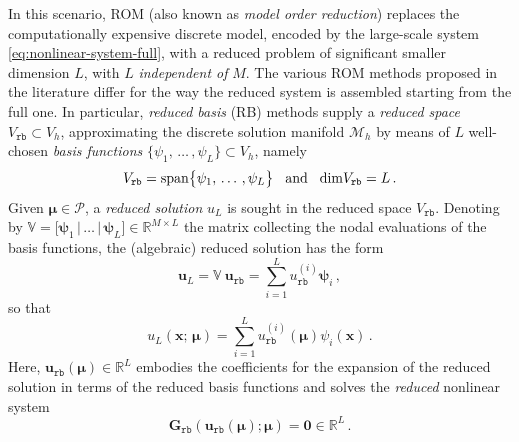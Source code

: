 \documentclass[12pt, a4paper, twoside, openright, notitlepage]{report}
\numberwithin{equation}{chapter}
\theoremstyle{theorem}
\theoremstyle{definition}
\theoremstyle{remark}
\theoremstyle{proposition}
\numberwithin{figure}{chapter}
\newcommand{\bg}[1]{\boldsymbol{#1}}
\begin{document}
		In this scenario, ROM (also known as \emph{model order reduction}) replaces the computationally expensive discrete model, encoded by the large-scale system \eqref{eq:nonlinear-system-full}, with a reduced problem of significant smaller dimension $L$, with $L$ \emph{independent of} $M$. The various ROM methods proposed in the literature differ for the way the reduced system is assembled starting from the full one. In particular, \emph{reduced basis} (RB) methods supply a \emph{reduced space} $V_{\texttt{rb}} \subset V_h$, approximating the discrete solution manifold $\mathcal{M}_h$ by means of $L$ well-chosen \emph{basis functions} $\big\lbrace \psi_1, \, \ldots \, , \psi_L \big\rbrace \subset V_h$, namely
		\begin{equation*}
			V_{\texttt{rb}} = \text{span}\big\lbrace \psi_1, \, \ldots \, , \psi_L \big\rbrace \hspace*{0.3cm} \text{and} \hspace*{0.3cm} \text{dim} V_{\texttt{rb}} = L \, .
		\end{equation*}
		Given $\boldsymbol{\mu} \in \mathcal{P}$, a \emph{reduced solution} $u_L$ is sought in the reduced space $V_{\texttt{rb}}$. Denoting by $\mathbb{V} = \big[ \bg{\psi}_1 \, \big| \, \ldots \, \big| \, \bg{\psi}_L \big] \in \mathbb{R}^{M \times L}$ the matrix collecting the nodal evaluations of the basis functions, the (algebraic) reduced solution has the form
		\begin{equation*}
			\label{eq:reduced-solution-algebraic}
			\mathbf{u}_L = \mathbb{V} ~ \mathbf{u}_{\texttt{rb}} = \sum_{i = 1}^L u_{\texttt{rb}}^{(i)} \bg{\psi}_i \, ,
		\end{equation*}
		so that
		\begin{equation*}
			\label{eq:reduced-solution}
			u_L(\bg{x}; \, \bg{\mu}) = \sum_{i = 1}^L u_{\texttt{rb}}^{(i)}(\bg{\mu}) \psi_i(\bg{x}) \, .
		\end{equation*}
		Here, $\mathbf{u}_{\texttt{rb}}(\boldsymbol{\mu}) \in \mathbb{R}^L$ embodies the coefficients for the expansion of the reduced solution in terms of the reduced basis functions and solves the \emph{reduced} nonlinear system
		\begin{equation}
			\label{eq:nonlinear-system-reduced}
			\mathbf{G}_{\texttt{rb}}(\mathbf{u}_{\texttt{rb}}(\boldsymbol{\mu}); \boldsymbol{\mu}) = \boldsymbol{0} \in \mathbb{R}^L \, .
		\end{equation}
\end{document}
